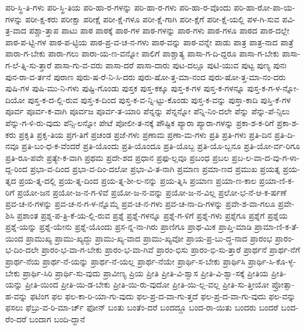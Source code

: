{ಪರಿ-ಸ್ಥಿ-ತಿ-ಗಳು
ಪರಿ-ಸ್ಥಿ-ತಿಯ
ಪರಿ-ಹಾ-ರ-ಗಳನ್ನು
ಪರಿ-ಹಾ-ರ-ಗಳು
ಪರಿ-ಹಾ-ರ-ವೊಂದು
ಪರಿ-ಹಾ-ರೋ-ಪಾ-ಯ-ಗಳನ್ನು
ಪರೀ-ಕ್ಷ-ಕರು
ಪರೀಕ್ಷಾ
ಪರೀಕ್ಷೆ
ಪರೀ-ಕ್ಷೆ-ಗಳೂ
ಪರೀ-ಕ್ಷೆ-ಗಾಗಿ
ಪರೀ-ಕ್ಷೆಗೆ
ಪರೀ-ಕ್ಷೆ-ಯಲ್ಲಿ
ಪಳ-ಗಿ-ಸುವ
ಪವಿ-ತ್ರ-ವಾದ
ಪಶ್ಚಾ-ತ್ತಾಪ
ಪಾಟು
ಪಾಠ
ಪಾಠಕ್ಕೆ
ಪಾಠ-ಗಳ
ಪಾಠ-ಗಳನ್ನು
ಪಾಠ-ಗಳು
ಪಾಠ-ಗಳೂ
ಪಾಠದ
ಪಾಠ-ದಲ್ಲೇ
ಪಾಠ-ಪ-ಟ್ಟಿ-ಗಳ
ಪಾಠ-ಪ-ಟ್ಟಿಯ
ಪಾಠ-ಪ್ರ-ವ-ಚ-ನ-ಗಳು
ಪಾಠ-ವನ್ನು
ಪಾಠ-ವನ್ನೇ
ಪಾಡು
ಪಾತ್ರ
ಪಾತ್ರ-ನಾದ
ಪಾತ್ರೆ
ಪಾರಾ-ಗ-ಬೇಕು
ಪಾರಾ-ಗಲು
ಪಾರಾ-ಯ-ಣ-ವನ್ನೋ
ಪಾಲಿಗೆ
ಪಾಶ್ಚಾತ್ಯ
ಪಾಸಾ-ಗ-ದಿ-ದ್ದರೂ
ಪಾಸಾ-ಗ-ಬೇಕು
ಪಾಸಾ-ಗ-ಲೆ-ತ್ನಿ-ಸು-ತ್ತಾರೆ
ಪಾಸಾ-ಗು-ವ-ವರು
ಪಾಸಾ-ದರೆ
ಪಾಸಾ-ದಾರು
ಪುಟ-ದಲ್ಲೂ
ಪುಟಿ-ಯುವ
ಪುಟ್ಟ
ಪುಣ್ಯ
ಪುನಃ
ಪುನ-ರಾ-ವ-ರ್ತನೆ
ಪುರಾಣ
ಪುರು-ಷ-ರೆ-ನಿ-ಸಿ-ದರು
ಪುರು-ಷೋ-ತ್ತ-ಮಾ-ನಂದ
ಪುರು-ಷೋ-ತ್ತ-ಮಾ-ನಂ-ದರು
ಪುಷಿ-ಗಳ
ಪುಷಿ-ಮು-ನಿ-ಗಳು
ಪುಷ್ಟಿ-ಗೊಂಡು
ಪುಸ್ತಕ
ಪುಸ್ತ-ಕಕ್ಕೂ
ಪುಸ್ತ-ಕ-ಗಳ
ಪುಸ್ತ-ಕ-ಗಳನ್ನೂ
ಪುಸ್ತ-ಕ-ಗ-ಳ-ನ್ನೋ-ದಿಯೋ
ಪುಸ್ತ-ಕ-ದ-ಲ್ಲಿ-ರುವ
ಪುಸ್ತ-ಕ-ದಿಂದ
ಪುಸ್ತ-ಕ-ವ-ನ್ನಿ-ಟ್ಟು-ಕೊಂಡು
ಪುಸ್ತ-ಕ-ವನ್ನು
ಪುಸ್ತಾ-ಕಾದಿ
ಪುಸ್ತಿ-ಕೆ-ಗಳ
ಪೂರ್ವ
ಪೂರ್ವ-ಕ-ವಾಗಿ
ಪೂರ್ವಜ
ಪೂರ್ವ-ತ-ಯಾರಿ
ಪೆನ್ನನ್ನು
ಪೆನ್ನನ್ನೋ
ಪೆನ್ನಿ-ನಿಂ-ದಲೇ
ಪೆನ್ನು
ಪೆನ್ನು-ಪೆ-ನ್ಸಿಲು
ಪೆನ್ನು-ಗ-ಳಿ-ರು-ವುದು
ಪೆನ್ಸಿ-ಲನ್ನೋ
ಪೇಟೆ
ಪೋಲೀ-ತ-ನಕ್ಕೆ
ಪೌಷ್ಟಿಕ
ಪ್ಯಾರಾ
ಪ್ಯಾರಾ-ಗಳನ್ನು
ಪ್ರಕಾ-ಶ-ಕ-ರಿಗೆ
ಪ್ರಕಾ-ಶ-ಕರು
ಪ್ರಕೃತಿ
ಪ್ರಕೃ-ತಿಯ
ಪ್ರಗ-ತಿಗೆ
ಪ್ರಚಂಡ
ಪ್ರಜೆ-ಗಳು
ಪ್ರಣಾಮ
ಪ್ರಣಾ-ಮ-ಗಳು
ಪ್ರತಿ
ಪ್ರತಿ-ಗಳು
ಪ್ರತಿ-ದಿನ
ಪ್ರತಿ-ದಿ-ನವೂ
ಪ್ರತಿ-ಬಂ-ಧ-ಕ-ವೆಂದರೆ
ಪ್ರತಿ-ಯೊಂದು
ಪ್ರತಿ-ಯೊಂದೂ
ಪ್ರತಿ-ಯೊಬ್ಬ
ಪ್ರತಿ-ಯೊ-ಬ್ಬನೂ
ಪ್ರತಿ-ಯೋ-ರ್ವ-ರಿಗೂ
ಪ್ರತಿ-ರೂ-ಪವೇ
ಪ್ರತ್ಯೇ-ಕ-ವಾಗಿ
ಪ್ರಥಮ
ಪ್ರದೇ-ಶದ
ಪ್ರಧಾನ
ಪ್ರಫು-ಲ್ಲವೂ
ಪ್ರಬಂಧ
ಪ್ರಬಲ
ಪ್ರಬ-ಲ-ವಾ-ದ-ವು-ಗ-ಳಾ-ದ್ದ-ರಿಂದ
ಪ್ರಭಾ-ವ-ದಿಂದ
ಪ್ರಭಾ-ವ-ದಿಂ-ದಲೋ
ಪ್ರಭಾ-ವಿ-ತ-ನಾಗಿ
ಪ್ರಮಾಣ
ಪ್ರಮಾ-ಣದ
ಪ್ರಮುಖ
ಪ್ರಯತ್ನ
ಪ್ರಯ-ತ್ನದ
ಪ್ರಯ-ತ್ನ-ದಲ್ಲಿ
ಪ್ರಯ-ತ್ನ-ದಿಂದ
ಪ್ರಯ-ತ್ನ-ಶೀ-ಲ-ನನ್ನು
ಪ್ರಯ-ತ್ನಿಸಿ
ಪ್ರಯಾಣ
ಪ್ರಯಾ-ಣ-ಕಾಲ
ಪ್ರಯಾ-ಣಿ-ಕ-ರಿಗೆ
ಪ್ರಯೋ-ಜನ
ಪ್ರಯೋ-ಜ-ನ-ಗ-ಳಿವೆ
ಪ್ರಯೋ-ಜ-ನ-ವನ್ನು
ಪ್ರಯೋ-ಜ-ನ-ವಿಲ್ಲ
ಪ್ರಲೋ-ಭ-ನೆ-ಆ-ಕ-ರ್ಷಣೆ
ಪ್ರವ-ಚ-ನ-ಗಳನ್ನು
ಪ್ರವ-ಚ-ನ-ಗ-ಳ-ನ್ನೊಮ್ಮೆ
ಪ್ರವ-ಚ-ನ-ಗಳು
ಪ್ರವ-ಚ-ನಾ-ದಿ-ಗಳನ್ನು
ಪ್ರವೇ-ಶ-ವಾ-ಗಲೂ
ಪ್ರವೇ-ಶಿಸಿ
ಪ್ರಶಾಂತ
ಪ್ರಶ್ನ-ಪ-ತ್ರಿ-ಕೆ-ಯ-ಲ್ಲಿ-ರುವ
ಪ್ರಶ್ನೆ
ಪ್ರಶ್ನೆ-ಗಳನ್ನೂ
ಪ್ರಶ್ನೆ-ಗ-ಳಿಗೆ
ಪ್ರಶ್ನೆ-ಗಳು
ಪ್ರಶ್ನೆಗೂ
ಪ್ರಶ್ನೆಗೆ
ಪ್ರಶ್ನೆಯ
ಪ್ರಶ್ನೆ-ಯನ್ನು
ಪ್ರಶ್ನೆ-ಯೇನು
ಪ್ರಶ್ನೆ-ಯೊಂದು
ಪ್ರಸ-ನ್ನ-ನಾ-ಗಿರು
ಪ್ರಾಣಿಗೂ
ಪ್ರಾಥ-ಮಿಕ
ಪ್ರಾಪ್ತಿ-ಮಾಡಿ
ಪ್ರಾಮಾ-ಣಿ-ಕ-ತೆ-ಯಿಂದ
ಪ್ರಾಮುಖ್ಯ
ಪ್ರಾಮು-ಖ್ಯದ್ದು
ಪ್ರಾಮು-ಖ್ಯ-ವಾದ
ಪ್ರಾಮು-ಖ್ಯವೋ
ಪ್ರಾಯ-ಪ್ರ-ಬು-ದ್ಧ-ನಾದ
ಪ್ರಾರಂಭ
ಪ್ರಾರಂ-ಭ-ದಿಂ-ದಲೇ
ಪ್ರಾರಂ-ಭ-ವಾ-ಗ-ಬೇಕು
ಪ್ರಾರಂ-ಭ-ವಾ-ಗಿವೆ
ಪ್ರಾರಂ-ಭಿಸು
ಪ್ರಾರಂ-ಭಿ-ಸು-ತ್ತಾರೆ
ಪ್ರಾರ್ಥನೆ
ಪ್ರಾರ್ಥ-ನೆಗೆ
ಪ್ರಾರ್ಥ-ನೆಯ
ಪ್ರಾರ್ಥ-ನೆ-ಯನ್ನು
ಪ್ರಾರ್ಥ-ನೆ-ಯಲ್ಲ
ಪ್ರಾರ್ಥ-ನೆಯೇ
ಪ್ರಾರ್ಥಿ-ಸ-ಬೇಕು
ಪ್ರಾರ್ಥಿಸಿ
ಪ್ರಾರ್ಥಿ-ಸಿ-ಕೊ-ಳ್ಳ-ಬೇಕು
ಪ್ರಾರ್ಥಿ-ಸಿರಿ
ಪ್ರಾರ್ಥಿ-ಸು-ವುದು
ಪ್ರಾವೀಣ್ಯ
ಪ್ರಿಯ
ಪ್ರೀತಿ
ಪ್ರೀತಿ-ವಿ-ಶ್ವಾಸ
ಪ್ರೀತಿ-ವಿ-ಶ್ವಾ-ಸಕ್ಕೆ
ಪ್ರೀತಿಯ
ಪ್ರೀತಿ-ಯನ್ನು
ಪ್ರೀತಿ-ಯಿಂದ
ಪ್ರೀತಿ-ಯಿ-ಡ-ಬೇಕು
ಪ್ರೀತಿ-ಯಿ-ರು-ವುದೋ
ಪ್ರೀತಿ-ಯಿ-ಲ್ಲ-ವಲ್ಲ
ಪ್ರೀತಿ-ಸು-ತ್ತೀಯೋ
ಪ್ರೋತ್ಸಾ-ಹ-ವನ್ನು
ಫಟಿಂಗ
ಫಲ
ಫಲ-ಕಾ-ರಿ-ಯಾ-ಗು-ವುದು
ಫಲ-ಪ್ರ-ದ-ವಾ-ಗು-ತ್ತದೆ
ಫಲ-ಪ್ರ-ದ-ವಾ-ಗು-ವುದು
ಫಲ-ವನ್ನು
ಫಸಲು
ಫೆಬ್ರು-ವ-ರಿ-ಮಾ-ರ್ಚ್
ಫೋನ್
ಬಂತು
ಬಂತೆಂ-ದರೆ
ಬಂದದ್ದೂ
ಬಂದ-ರಾ-ಯಿತು
ಬಂದರು
ಬಂದರೆ
ಬಂದ-ರೆಂ-ದರೆ
ಬಂದಾಗ
ಬಂದಿ-ದ್ದಾನೆ
}
